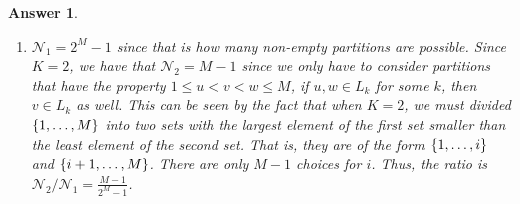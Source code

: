\documentclass[12pt]{article}
\theoremstyle{colon}
\newtheorem*{answer}{Answer}
\begin{document}
\begin{answer}
\begin{enumerate}[label=\arabic*)]
      Case 1, $Avg(L_k) < Avg(L_{k'}) \leq \bar{Y}_v$. Since $\bar{Y}_w > \bar{Y}_v$, we have
      \begin{gather*}
        0 < \bar{Y}_w - Avg(L_{k'}) < \bar{Y}_w - Avg(L_k) \\
        \implies \lvert \bar{Y}_w - Avg(L_{k'}) \rvert  < \lvert \bar{Y}_w - Avg(L_k) \rvert
      \end{gather*}
      Which contradicts the optimality of $\alpha_k$.

      Case 2, $Avg(L_k) \leq \bar{Y}_v < Avg(L_{k'})$. If $Avg(L_{k'}) < \bar{Y}_w$ then we get the same as above. Otherwise we have, $Avg(L_{k'}) \geq \bar{Y}_w$. By optimality of $Avg(L_{k'}$
      \begin{gather*}
        \bar{Y}_v - Avg(L_k) \geq Avg(L_{k'}) - \bar{Y}_v \\
        2 \bar{Y}_v \geq Avg(L_{k'}) + Avg(L_k)
      \end{gather*}
      But by assumption and optimality of $Avg(L_k)$
      \begin{gather*}
        2 \bar{Y}_w \leq Avg(L_{k'}) + Avg(L_k)
      \end{gather*}
      Which is a contradiction that $\bar{Y}_w > \bar{Y}_v$.

      Case 3, $\bar{Y}_v < Avg(L_k) < Avg(L_{k'})$
      \begin{gather*}
        0 < Avg(L_k) - \bar{Y}_v < Avg(L_{k'}) - \bar{Y}_v \\
        \implies \lvert Avg(L_k) - \bar{Y}_v \rvert < \lvert Avg(L_{k'}) - \bar{Y}_v \rvert
      \end{gather*}
      which contradicts the optimality of $Avg(L_{k'})$. This handles the three cases and so we conclude that $v \in L_k$ as well.

    \item $\mathcal{N}_1 = 2^M - 1$ since that is how many non-empty partitions are possible. Since $K=2$, we have that $\mathcal{N}_2 = M - 1$ since we only have to consider partitions that have the property $1 \leq u < v < w \leq M$, if $u,w \in L_k$ for some $k$, then $v \in L_k$ as well. This can be seen by the fact that when $K=2$, we must divided $\{1,\mathellipsis,M\}$ into two sets with the largest element of the first set smaller than the least element of the second set. That is, they are of the form $\{1,\mathellipsis,i\}$ and $\{i+1, \mathellipsis,M\}$. There are only $M-1$ choices for $i$. Thus, the ratio is $\mathcal{N}_2/\mathcal{N}_1=\frac{M-1}{2^M-1}$.
  \end{enumerate}
\end{answer}
\end{document}
